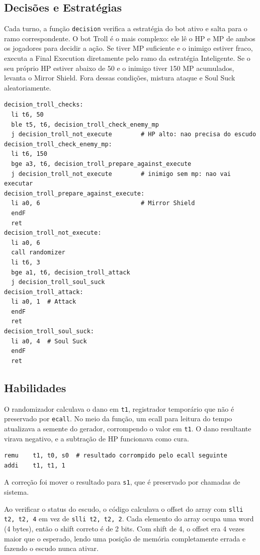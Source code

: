 \documentclass[AMA,twocolumn]{USG}
\begin{document}
\subsection{Decisões e Estratégias}

Cada turno, a função \texttt{decision} verifica a estratégia do bot ativo e salta para o ramo correspondente. O bot Troll é o mais complexo: ele lê o HP e MP de ambos os jogadores para decidir a ação. Se tiver MP suficiente e o inimigo estiver fraco, executa a Final Execution diretamente pelo ramo da estratégia Inteligente. Se o seu próprio HP estiver abaixo de 50 e o inimigo tiver 150 MP acumulados, levanta o Mirror Shield. Fora dessas condições, mistura ataque e Soul Suck aleatoriamente.

\begin{verbatim}
decision_troll_checks:
  li t6, 50
  ble t5, t6, decision_troll_check_enemy_mp
  j decision_troll_not_execute        # HP alto: nao precisa do escudo
decision_troll_check_enemy_mp:
  li t6, 150
  bge a3, t6, decision_troll_prepare_against_execute
  j decision_troll_not_execute        # inimigo sem mp: nao vai executar
decision_troll_prepare_against_execute:
  li a0, 6                            # Mirror Shield
  endF
  ret
decision_troll_not_execute:
  li a0, 6
  call randomizer
  li t6, 3
  bge a1, t6, decision_troll_attack
  j decision_troll_soul_suck
decision_troll_attack:
  li a0, 1  # Attack
  endF
  ret
decision_troll_soul_suck:
  li a0, 4  # Soul Suck
  endF
  ret
\end{verbatim}

\subsection{Habilidades}

O randomizador calculava o dano em \texttt{t1}, registrador temporário que não é preservado por \texttt{ecall}. No meio da função, um ecall para leitura do tempo atualizava a semente do gerador, corrompendo o valor em \texttt{t1}. O dano resultante virava negativo, e a subtração de HP funcionava como cura.

\begin{verbatim}
remu    t1, t0, s0  # resultado corrompido pelo ecall seguinte
addi    t1, t1, 1
\end{verbatim}

A correção foi mover o resultado para \texttt{s1}, que é preservado por chamadas de sistema.

Ao verificar o status do escudo, o código calculava o offset do array com \texttt{slli t2, t2, 4} em vez de \texttt{slli t2, t2, 2}. Cada elemento do array ocupa uma word (4 bytes), então o shift correto é de 2 bits. Com shift de 4, o offset era 4 vezes maior que o esperado, lendo uma posição de memória completamente errada e fazendo o escudo nunca ativar.
\end{document}
